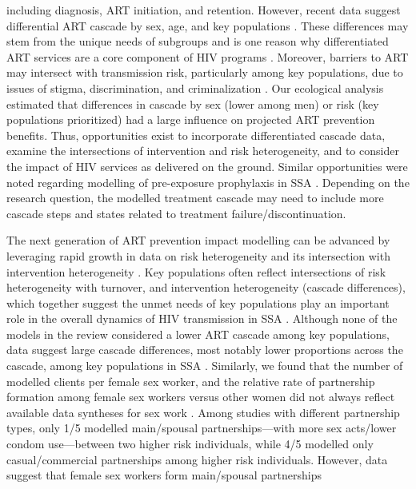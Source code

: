 including diagnosis, ART initiation, and retention.
However, recent data suggest differential ART cascade by sex, age, and key populations
\cite{Lancaster2016,Stannah2019,Ma2020,Green2020}.
These differences may stem from the unique needs of subgroups
and is one reason why differentiated ART services are a core component of HIV programs
\cite{Chikwari2018,Ehrenkranz2019}.
Moreover, barriers to ART may intersect with transmission risk, particularly among key populations,
due to issues of stigma, discrimination, and criminalization \cite{Ortblad2019,Baral2019}.
Our ecological analysis estimated that
differences in cascade by sex (lower among men) or risk (key populations prioritized)
had a large influence on projected ART prevention benefits.
Thus, opportunities exist to incorporate differentiated cascade data,
examine the intersections of intervention and risk heterogeneity, and
to consider the impact of HIV services as delivered on the ground.
Similar opportunities were noted regarding modelling of pre-exposure prophylaxis in SSA \cite{Case2019}.
Depending on the research question, the modelled treatment cascade may need
to include more cascade steps and states related to treatment failure/discontinuation.
\par
The next generation of ART prevention impact modelling can be advanced by leveraging
rapid growth in data on risk heterogeneity and its intersection with intervention heterogeneity
\cite{Beyrer2012,Baral2012,Mishra2016}.
Key populations often reflect intersections of risk heterogeneity with turnover,
and intervention heterogeneity (cascade differences),
which together suggest the unmet needs of key populations
play an important role in the overall dynamics of HIV transmission in SSA \cite{Bekker2015,Stone2021}.
Although none of the models in the review considered a lower ART cascade among key populations,
data suggest large cascade differences, most notably lower proportions across the cascade,
among key populations in SSA \cite{Mountain2014,Hakim2018,Stannah2019}.
Similarly, we found that the number of modelled clients per female sex worker, and
the relative rate of partnership formation among female sex workers versus other women
did not always reflect available data syntheses for sex work \cite{Watts2010,Scorgie2012}.
Among studies with different partnership types, only 1/5 modelled
main/spousal partnerships---with more sex acts/lower condom use---between two higher risk individuals,
while 4/5 modelled only casual/commercial partnerships among higher risk individuals.
However, data suggest that female sex workers form main/spousal partnerships
